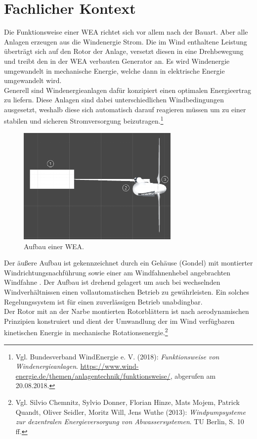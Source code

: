 \section{Fachlicher Kontext}
\label{sec:FachlicherKontext}
Die Funktionsweise einer WEA richtet sich vor allem nach der Bauart. Aber alle Anlagen erzeugen aus die Windenergie Strom. Die im Wind enthaltene Leistung überträgt sich auf den Rotor der Anlage, versetzt diesen in eine Drehbewegung und treibt den in der WEA verbauten Generator an. Es wird Windenergie umgewandelt in mechanische Energie, welche dann in elektrische Energie umgewandelt wird. \\
Generell sind Windenergieanlagen dafür konzipiert einen optimalen Energieertrag zu liefern. Diese Anlagen sind dabei unterschiedlichen Windbedingungen ausgesetzt, weshalb diese sich automatisch darauf reagieren müssen um zu einer stabilen und sicheren Stromversorgung beizutragen.\footnote{Vgl. Bundesverband WindEnergie e. V.  (2018): \textit{Funktionsweise von Windenergieanlagen}.\newline
\url{https://www.wind-energie.de/themen/anlagentechnik/funktionsweise/},\newline 
abgerufen am 20.08.2018.}  





\begin{figure}[H]
	\centering
	\captionsetup{width=0.7\textwidth}
	\includegraphics[keepaspectratio, width=0.7\textwidth]{bildquellen/WEA1_1}
	\caption{Aufbau einer WEA.}
	\label{fig:1}
\end{figure}

Der äußere Aufbau ist gekennzeichnet durch ein Gehäuse (Gondel) mit montierter Windrichtungsnachführung  sowie einer am Windfahnenhebel angebrachten Windfahne . Der Aufbau ist drehend gelagert um auch bei wechselnden Windverhältnissen einen vollautomatischen Betrieb zu gewährleisten. Ein solches Regelungssystem ist für einen zuverlässigen Betrieb unabdingbar. \\
Der Rotor mit an der Narbe montierten Rotorblättern  ist nach aerodynamischen Prinzipien konstruiert und dient der Umwandlung der im Wind verfügbaren kinetischen Energie in mechanische Rotationsenergie.\footnote{Vgl. Silvio Chemnitz, Sylvio Donner, Florian Hinze, Mats Mojem, Patrick Quandt, Oliver Seidler, Moritz Will, Jens Wuthe (2013): \textit{Windpumpsysteme zur dezentralen Energieversorgung von Abwassersystemen}. TU Berlin, S. 10 ff.}

